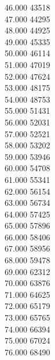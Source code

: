 { 46.000	43518 \\
 47.000	44295 \\
 48.000	44925 \\
 49.000	45335 \\
 50.000	46114 \\
 51.000	47019 \\
 52.000	47624 \\
 53.000	48175 \\
 54.000	48753 \\
 55.000	51431 \\
 56.000	52031 \\
 57.000	52521 \\
 58.000	53202 \\
 59.000	53946 \\
 60.000	54708 \\
 61.000	55341 \\
 62.000	56154 \\
 63.000	56734 \\
 64.000	57425 \\
 65.000	57896 \\
 66.000	58406 \\
 67.000	58956 \\
 68.000	59478 \\
 69.000	62312 \\
 70.000	63876 \\
 71.000	64625 \\
 72.000	65179 \\
 73.000	65765 \\
 74.000	66394 \\
 75.000	67024 \\
 76.000	68490 \\
}
